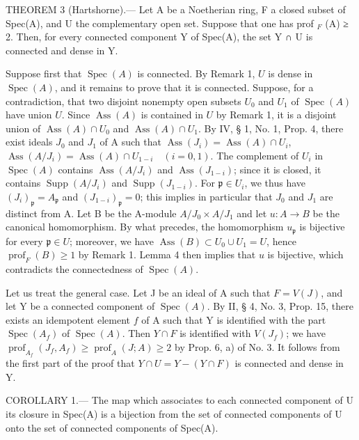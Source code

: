 THEOREM 3 (Hartshorne).--- Let A be a Noetherian ring, F a closed subset of Spec(A), and U the complementary open set. Suppose that one has prof \(_{F}\) (A) ≥ 2. Then, for every connected component Y of Spec(A), the set Y ∩ U is connected and dense in Y.

Suppose first that \(\operatorname{Spec}(A)\) is connected. By Remark 1, \(U\) is dense in \(\operatorname{Spec}(A)\), and it remains to prove that it is connected. Suppose, for a contradiction, that two disjoint nonempty open subsets \(U_0\) and \(U_1\) of \(\operatorname{Spec}(A)\) have union \(U\). Since \(\operatorname{Ass}(A)\) is contained in \(U\) by Remark 1, it is a disjoint union of \(\operatorname{Ass}(A) \cap U_0\) and \(\operatorname{Ass}(A) \cap U_1\). By IV, § 1, No. 1, Prop. 4, there exist ideals \(J_0\) and \(J_1\) of A such that \(\operatorname{Ass}(J_i) = \operatorname{Ass}(A) \cap U_i\), \(\operatorname{Ass}(A/J_i) = \operatorname{Ass}(A) \cap U_{1-i}\quad (i=0,1)\). The complement of \(U_i\) in \(\operatorname{Spec}(A)\) contains \(\operatorname{Ass}(A/J_i)\) and \(\operatorname{Ass}(J_{1-i})\); since it is closed, it contains \(\operatorname{Supp}(A/J_i)\) and \(\operatorname{Supp}(J_{1-i})\). For \(\mathfrak{p} \in U_i\), we thus have \((J_i)_{\mathfrak{p}} = A_{\mathfrak{p}}\) and \((J_{1-i})_{\mathfrak{p}} = 0\); this implies in particular that \(J_0\) and \(J_1\) are distinct from A. Let B be the A-module \(A/J_0 \times A/J_1\) and let \(u: A \to B\) be the canonical homomorphism. By what precedes, the homomorphism \(u_{\mathfrak{p}}\) is bijective for every \(\mathfrak{p} \in U\); moreover, we have \(\operatorname{Ass}(B) \subset U_0 \cup U_1 = U\), hence \(\operatorname{prof}_F(B) \geqslant 1\) by Remark 1. Lemma 4 then implies that \(u\) is bijective, which contradicts the connectedness of \(\operatorname{Spec}(A)\).

Let us treat the general case. Let J be an ideal of A such that \(F = V(J)\), and let Y be a connected component of \(\operatorname{Spec}(A)\). By II, § 4, No. 3, Prop. 15, there exists an idempotent element \(f\) of A such that Y is identified with the part \(\operatorname{Spec}(A_f)\) of \(\operatorname{Spec}(A)\). Then \(Y \cap F\) is identified with \(V(J_f)\); we have \(\operatorname{prof}_{A_f}(J_f, A_f) \geqslant \operatorname{prof}_A(J; A) \geqslant 2\) by Prop. 6, a) of No. 3. It follows from the first part of the proof that \(Y \cap U = Y - (Y \cap F)\) is connected and dense in Y.

COROLLARY 1.--- The map which associates to each connected component of U its closure in Spec(A) is a bijection from the set of connected components of U onto the set of connected components of Spec(A).

